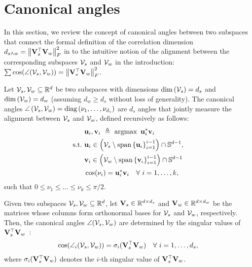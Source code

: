 \section{Canonical angles}\label{apx:canonical_angles}
In this section, we review the concept of canonical angles between two subspaces that connect the formal definition of the correlation dimension $d_{s \wedge w} = \left\|\mathbf{V}_s^\top \mathbf{V}_w\right\|_F^2$ in  to the intuitive notion of the alignment between the corresponding subspaces $\mathcal{V}_s$ and $\mathcal{V}_w$ in the introduction: $\sum \cos(\angle(\mathcal{V}_s, \mathcal{V}_w)) = \left\|\mathbf{V}_s^\top \mathbf{V}_w\right\|_F^2$.
\begin{definition}\label{def:canonical_angles}
    Let $\mathcal{V}_s,\mathcal{V}_w \subseteq \mathbb{R}^d$ be two subspaces with dimensions $\dim\left(\mathcal{V}_s\right)=d_s$ and $\dim\left(\mathcal{V}_w\right)=d_w$ (assuming $d_w \geq d_s$ without loss of generality). The canonical angles $\angle\left(\mathcal{V}_s,\mathcal{V}_w\right)=\mathop{\mathrm{diag}}\left(\nu_1,\dots,\nu_{d_s}\right)$ are $d_s$ angles that jointly measure the alignment between $\mathcal{V}_s$ and $\mathcal{V}_w$, defined recursively as follows:
    \begin{align*}
        &\mathbf{u}_i, \mathbf{v}_i ~\triangleq~
        \mathop{\mathrm{argmax}}~\mathbf{u}_i^*\mathbf{v}_i \\
        \text{s.t.}~
        &\mathbf{u}_i \in \left(\mathcal{V}_s \setminus \mathop{\mathrm{span}}\left\{\mathbf{u}_{\iota}\right\}_{\iota=1}^{i-1}\right) \cap \mathbb{S}^{d-1},\\ 
        &\mathbf{v}_i \in \left(\mathcal{V}_w \setminus \mathop{\mathrm{span}}\left\{\mathbf{v}_{\iota}\right\}_{\iota=1}^{i-1}\right) \cap \mathbb{S}^{d-1}\\
        &\cos (\nu_i) = \mathbf{u}_i^* \mathbf{v}_i \quad \forall~ i=1,\dots,k,
    \end{align*}
    such that $0 \leq \nu_1 \leq \dots \leq \nu_k \leq \pi/2$.

    Given two subspaces $\mathcal{V}_s,\mathcal{V}_w \subseteq \mathbb{R}^d$, let $\mathbf{V}_s \in \mathbb{R}^{d \times d_s}$ and $\mathbf{V}_w \in \mathbb{R}^{d \times d_w}$ be the matrices whose columns form orthonormal bases for $\mathcal{V}_s$ and $\mathcal{V}_w$, respectively. Then, the canonical angles $\angle(\mathcal{V}_s, \mathcal{V}_w)$ are determined by the singular values of $\mathbf{V}_s^\top \mathbf{V}_w$~\citep[\S 3]{bjorck1973numerical}:
    \begin{align*}
        \cos(\angle_i(\mathcal{V}_s, \mathcal{V}_w)) = \sigma_i(\mathbf{V}_s^\top \mathbf{V}_w) \quad \forall~ i=1,\dots,d_s,
    \end{align*}
    where $\sigma_i(\mathbf{V}_s^\top \mathbf{V}_w)$ denotes the $i$-th singular value of $\mathbf{V}_s^\top \mathbf{V}_w$.
\end{definition}

